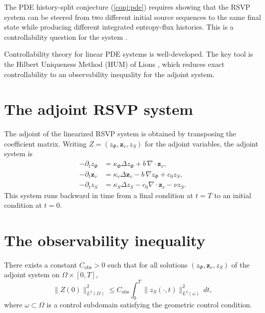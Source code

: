 \documentclass[12pt, oneside]{memoir}
\newcommand{\nnorm}[1]{\lVert #1 \rVert}
\begin{document}
The PDE history-split conjecture (\cref{conj:pde}) requires showing that the RSVP system
can be steered from two different initial source sequences to the same final state while
producing different integrated entropy-flux histories.  This is a controllability
question for the system .

Controllability theory for linear PDE systems is well-developed.  The key tool is the
Hilbert Uniqueness Method (HUM) of Lions \cite{lions1988}, which reduces exact
controllability to an observability inequality for the adjoint system.

\section{The adjoint RSVP system}

The adjoint of the linearized RSVP system is obtained by transposing the coefficient
matrix.  Writing $Z = (z_\Phi, \mathbf{z}_v, z_S)$ for the adjoint variables, the
adjoint system is
\begin{align}
  -\partial_t z_\Phi &= \kappa_\Phi \Delta z_\Phi + b\, \nabla \cdot \mathbf{z}_v,
  \label{eq:adj-phi}\\
  -\partial_t \mathbf{z}_v &= \kappa_v \Delta \mathbf{z}_v - b\, \nabla z_\Phi
                             + c_0 z_S,
  \label{eq:adj-v}\\
  -\partial_t z_S &= \kappa_S \Delta z_S - c_0 \nabla \cdot \mathbf{z}_v - \nu z_S.
  \label{eq:adj-S}
\end{align}
This system runs backward in time from a final condition at $t = T$ to an initial
condition at $t = 0$.

\section{The observability inequality}

\begin{conjecture}
\label{conj:obs-ineq}
There exists a constant $C_{\mathrm{obs}} > 0$ such that for all solutions $(z_\Phi,
\mathbf{z}_v, z_S)$ of the adjoint system  on
$\Omega \times [0,T]$,
\begin{equation}\label{eq:obs-ineq}
  \nnorm{Z(0)}_{L^2(\Omega)}^2 \le C_{\mathrm{obs}} \int_0^T \nnorm{z_S(\cdot, t)}^2_{L^2(\omega)}\, dt,
\end{equation}
where $\omega \subset \Omega$ is a control subdomain satisfying the geometric control
condition.
\end{conjecture}
\end{document}
